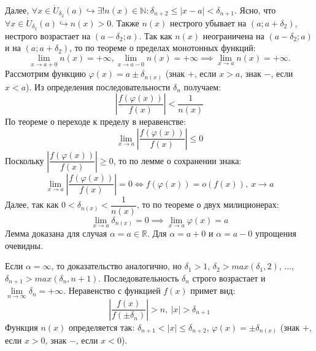 \documentclass[12pt, a4paper, reqno]{article}
\begin{document}
    Далее, $\forall x \in \mathring U_{\delta_2}(a) \hookrightarrow \exists! n(x)\in\mathbb{N}:
    \delta_{n + 2}\leq |x - a| < \delta_{n + 1}$. Ясно, что $\forall x \in \mathring U_{\delta_2}(a)
    \hookrightarrow n(x)  > 0$. Также $n(x)$ нестрого убывает на $(a; a + \delta_2)$, нестрого
    возрастает на $(a - \delta_2; a)$. Так как $n(x)$ неограничена на $(a - \delta_2; a)$ и на
    $(a; a + \delta_2)$, то по теореме о пределах монотонных функций:
    \begin{equation*}
        \lim\limits_{x\to a+0} n(x) = +\infty, \lim\limits_{x\to a-0} n(x) = +\infty \implies
        \lim\limits_{x\to a} n(x) = +\infty.
    \end{equation*}
    Рассмотрим функцию $\varphi(x) = a\pm \delta_{n(x)}$ (знак $+$, если $x > a$, знак $-$, если
    $x < a$). Из определения последовательности $\delta_n$ получаем:
    \begin{equation*}
        \left|\dfrac{f(\varphi(x))}{f(x)}\right| < \dfrac{1}{n(x)}
    \end{equation*}
    По теореме о переходе к пределу в неравенстве:
    \begin{equation*}
        \lim\limits_{x\to a} \left|\dfrac{f(\varphi(x))}{f(x)}\right| \leq 0
    \end{equation*}
    Поскольку $\left|\dfrac{f(\varphi(x))}{f(x)}\right| \geq 0$, то по лемме о сохранении знака:
    \begin{equation*}
        \lim\limits_{x\to a} \left|\dfrac{f(\varphi(x))}{f(x)}\right| = 0 \iff
        f(\varphi(x)) = o(f(x)),\ x\to a
    \end{equation*}
    Далее, так как $0 < \delta_{n(x)} < \dfrac{1}{n(x)}$, то по теореме о двух милиционерах:
    \begin{equation*}
        \lim\limits_{x\to a} \delta_{n(x)} = 0 \implies \lim\limits_{x\to a} \varphi(x) = a
    \end{equation*}
    Лемма доказана для случая $\alpha = a\in\mathbb{R}$. Для $\alpha = a + 0$ и $\alpha = a - 0$
    упрощения очевидны.

    Если $\alpha = \infty$, то доказательство аналогично, но $\delta_1 > 1$,
    $\delta_2 > max(\delta_1, 2)$, ..., $\delta_{n + 1} > max(\delta_n, n + 1)$. Последовательность
    $\delta_n$ строго возрастает и $\lim\limits_{n\to\infty}\delta_n = +\infty$. Неравенство с
    функцией $f(x)$ примет вид:
    \begin{equation*}
        \left|\dfrac{f(x)}{f(\pm\delta_n)}\right| > n,\ |x| > \delta_{n + 1}
    \end{equation*}
    Функция $n(x)$ определяется так: $\delta_{n + 1} < |x| \leq \delta_{n + 2}$,
    $\varphi(x) = \pm\delta_{n(x)}$ (знак $+$, если $x > 0$, знак $-$, если $x < 0$).
\end{document}
